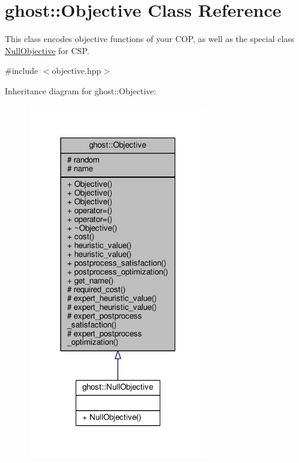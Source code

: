 \hypertarget{classghost_1_1Objective}{}\section{ghost\+:\+:Objective Class Reference}
\label{classghost_1_1Objective}


This class encodes objective functions of your C\+OP, as well as the special class \hyperlink{classghost_1_1NullObjective}{Null\+Objective} for C\+SP.  




{\ttfamily \#include $<$objective.\+hpp$>$}



Inheritance diagram for ghost\+:\+:Objective\+:
\nopagebreak
\begin{figure}[H]
\begin{center}
\leavevmode
\includegraphics[width=223pt]{classghost_1_1Objective__inherit__graph}
\end{center}
\end{figure}


